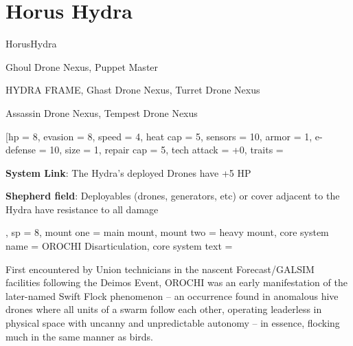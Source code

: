 \section{Horus Hydra}

\begin{mech}{Horus}{Hydra}


\begin{license}
\item Ghoul Drone Nexus, Puppet Master
\item HYDRA FRAME, Ghast Drone Nexus, Turret Drone Nexus
\item Assassin Drone Nexus, Tempest Drone Nexus
\end{license}


\frameBox
[hp = 8,
evasion = 8,
speed = 4,
heat cap = 5,
sensors = 10,
armor = 1,
e-defense = 10,
size = 1,
repair cap = 5,
tech attack = +0,
traits = {\textbf{System Link}: The Hydra’s deployed Drones have +5 HP

\textbf{Shepherd field}: Deployables (drones, generators, etc) or cover adjacent to the Hydra have resistance to all damage},
sp = 8,
mount one = main mount,
mount two = heavy mount,
core system name = OROCHI Disarticulation,
core system text = {First encountered by Union technicians in the nascent Forecast/GALSIM facilities following the Deimos Event, OROCHI was an early manifestation of the later-named Swift Flock phenomenon -- an occurrence found in anomalous hive drones where all units of a swarm follow each other, operating leaderless in physical space with uncanny and unpredictable autonomy -- in essence, flocking much in the same manner as birds. 

}
\end{mech}
